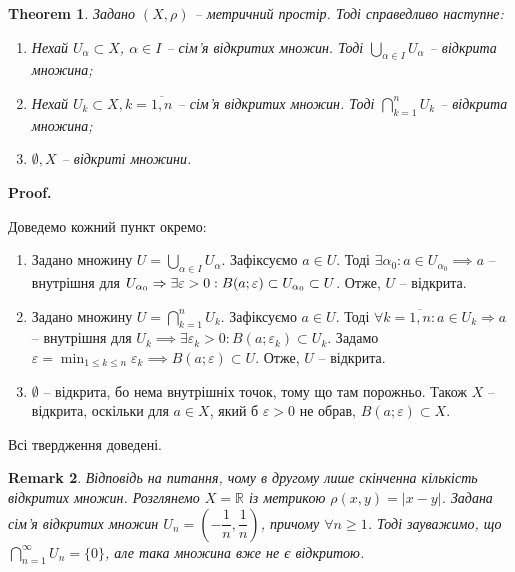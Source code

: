 \documentclass[a4paper, 10pt]{article}
\makeatletter
\theoremstyle{theoremdd}
\newtheorem{theorem}{Theorem}[subsection]
\theoremstyle{theoremdd}
\theoremstyle{theoremdd}
\theoremstyle{theoremdd}
\theoremstyle{theoremdd}
\theoremstyle{theoremdd}
\newtheorem{remark}[theorem]{Remark}
\theoremstyle{theoremdd}
\theoremstyle{theoremdd}
\renewenvironment{proof}[1][Proof.\\]{\par
\pushQED{\hfill \qed}%
\normalfont \topsep6\p@\@plus6\p@\relax
\trivlist
\item\relax
{\bfseries
#1\@addpunct{.}}\hspace\labelsep\ignorespaces
}{%
\popQED\endtrivlist\@endpefalse
}
\makeatother
\begin{document}
\begin{theorem} 
Задано $(X,\rho)$ -- метричний простір. Тоді справедливо наступне:
\begin{enumerate}[nosep,wide=0pt,label={\arabic*)}]
\item Нехай $U_{\alpha} \subset X$, $\alpha \in I$ -- сім'я відкритих множин. Тоді $\displaystyle \bigcup_{\alpha \in I} U_{\alpha}$ -- відкрита множина;
\item Нехай $U_k \subset X, k = \overline{1,n}$ -- сім'я відкритих множин. Тоді $\displaystyle \bigcap_{k=1}^n U_k$ -- відкрита множина;
\item $\emptyset, X$ -- відкриті множини.
\end{enumerate}
\end{theorem}

\begin{proof}
Доведемо кожний пункт окремо:
\begin{enumerate}[wide=0pt,label={\arabic*)}]
\item Задано множину $U = \displaystyle \bigcup_{\alpha \in I} U_{\alpha}$. Зафіксуємо $a \in U$. Тоді $\exists \alpha_0: a \in U_{\alpha_0} \implies a$ -- внутрішня для $U_{\alpha_0} \\ \Rightarrow \exists \varepsilon > 0: B(a;\varepsilon) \subset U_{\alpha_0} \subset U$. Отже, $U$ -- відкрита.

\item Задано множину $U = \displaystyle \bigcap_{k=1}^n U_k$. Зафіксуємо $a \in U$. Тоді $\forall k = \overline{1,n}: a \in U_k \Rightarrow a$ -- внутрішня для $U_k \implies \exists \varepsilon_k > 0: B(a;\varepsilon_k) \subset U_k$. Задамо $\varepsilon = \displaystyle\min_{1 \leq k \leq n} \varepsilon_k \implies B(a;\varepsilon) \subset U$. Отже, $U$ -- відкрита.

\item $\emptyset$ -- відкрита, бо нема внутрішніх точок, тому що там порожньо. Також $X$ -- відкрита, оскільки для $a \in X$, який б $\varepsilon > 0$ не обрав, $B(a;\varepsilon) \subset X$.
\end{enumerate}
Всі твердження доведені.
\end{proof}

\begin{remark}
Відповідь на питання, чому в другому лише скінченна кількість відкритих множин. Розглянемо $X = \mathbb{R}$ із метрикою $\rho(x,y) = |x-y|$. Задана сім'я відкритих множин $U_n = \left( -\dfrac{1}{n}, \dfrac{1}{n} \right)$, причому $\forall n \geq 1$. Тоді зауважимо, що $\displaystyle\bigcap_{n=1}^\infty U_n = \{0\}$, але така множина вже не є відкритою.
\end{remark}
\end{document}
